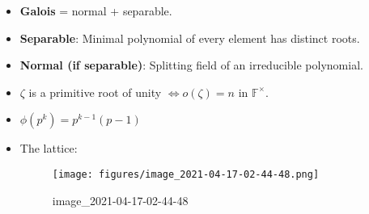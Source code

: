 \begin{concept}

\envlist

\begin{itemize}
\item
  \textbf{Galois} = normal + separable.
\item
  \textbf{Separable}: Minimal polynomial of every element has distinct
  roots.
\item
  \textbf{Normal (if separable)}: Splitting field of an irreducible
  polynomial.
\item
  \(\zeta\) is a primitive root of unity \(\iff o(\zeta) = n\) in
  \({\mathbb{F}}^{\times}\).
\item
  \(\phi(p^k) = p^{k-1}(p-1)\)
\item
  The lattice:

  \begin{figure}
  \centering
  \texttt{[image: figures/image\_2021-04-17-02-44-48.png]}
  \caption{image\_2021-04-17-02-44-48}
  \end{figure}
\end{itemize}

\end{concept}

